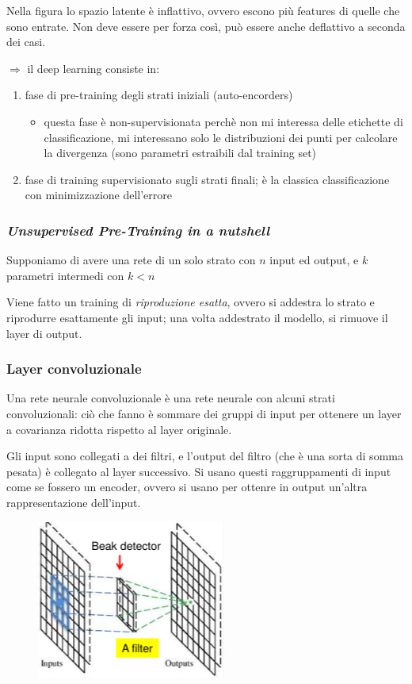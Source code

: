 \documentclass{report}
\begin{document}
\noindent Nella figura lo spazio latente è inflattivo, ovvero escono più features di quelle che sono entrate. Non deve essere per forza così, può 
essere anche deflattivo a seconda dei casi.


\noindent $\Rightarrow$ il deep learning consiste in:
\begin{enumerate}
    \item fase di pre-training degli strati iniziali (auto-encorders)
    \begin{itemize}
        \item questa fase è non-supervisionata perchè non mi interessa delle etichette di classificazione, mi interessano solo le distribuzioni dei 
        punti per calcolare la divergenza (sono parametri estraibili dal training set)
    \end{itemize}
    \item fase di training supervisionato sugli strati finali; è la classica classificazione con minimizzazione dell'errore 
\end{enumerate}

\subsubsection{\textit{Unsupervised Pre-Training in a nutshell}}

Supponiamo di avere una rete di un solo strato con $n$ input ed output, e $k$ parametri intermedi con $k<n$

\noindent Viene fatto un training di \textit{riproduzione esatta}, ovvero si addestra lo strato e riprodurre esattamente gli input; una volta 
addestrato il modello, si rimuove il layer di output.


\subsubsection{Layer convoluzionale}

Una rete neurale convoluzionale è una rete neurale con alcuni strati convoluzionali: ciò che fanno è sommare dei gruppi di input per 
ottenere un layer a covarianza ridotta rispetto al layer originale.

\noindent Gli input sono collegati a dei filtri, e l'output del filtro (che è una sorta di somma pesata) è collegato al layer successivo. Si usano 
questi raggruppamenti di input come se fossero un encoder, ovvero si usano per ottenre in output un'altra rappresentazione dell'input.

\begin{figure}[H]
    \centering
    \includegraphics[width=0.5\linewidth]{images/convolutional.png}
\end{figure}
\end{document}
